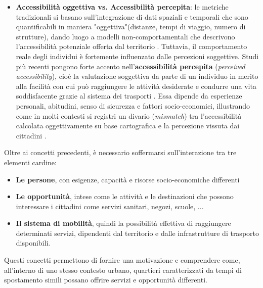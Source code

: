 \begin{itemize}
    \item \textbf{Accessibilità oggettiva vs. Accessibilità percepita}: le metriche tradizionali si basano sull'integrazione di dati spaziali e temporali che sono quantificabili in maniera "oggettiva"(distanze, tempi di viaggio, numero di strutture), dando luogo a modelli non-comportamentali che descrivono l'accessibilità potenziale offerta dal territorio \cite{mazzulla2024, battiston2024}.
     Tuttavia, il comportamento reale degli individui è fortemente influenzato dalle percezioni soggettive. Studi più recenti pongono forte accento nell'\textbf{accessibilità percepita} (\textit{perceived accessibility}), cioè la valutazione soggettiva da parte di un individuo in merito alla facilità con cui può raggiungere le attività desiderate e condurre una vita soddisfacente grazie al sistema dei trasporti \cite{mazzulla2024}.
     Essa dipende da esperienze personali, abitudini, senso di sicurezza e fattori socio-economici, illustrando come in molti contesti si registri un divario (\textit{mismatch}) tra l'accessibilità calcolata oggettivamente su base cartografica e la percezione vissuta dai cittadini \cite{mazzulla2024}.
    
\end{itemize}
Oltre ai concetti precedenti, è necessario soffermarsi sull'interazione tra tre elementi cardine:
\begin{itemize}
    \item \textbf{Le persone}, con esigenze, capacità e risorse socio-economiche differenti
    \item \textbf{Le opportunità}, intese come le attività e le destinazioni che possono interessare i cittadini come servizi sanitari, negozi, scuole, ...
    \item \textbf{Il sistema di mobilità}, quindi la possibilità effettiva di raggiungere determinati servizi, dipendenti dal territorio e dalle infrastrutture di trasporto disponibili.
\end{itemize}
Questi concetti permettono di fornire una motivazione e comprendere come, all'interno di uno stesso contesto urbano, quartieri caratterizzati da tempi di spostamento simili possano offrire servizi e opportunità differenti.

